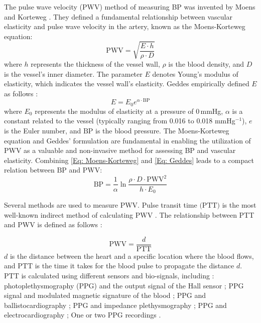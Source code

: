 \documentclass[journal,article,moreauthors]{Definitions/mdpi}
\begin{document}
The pulse wave velocity (PWV) method of measuring BP was invented by Moens and Korteweg \citep{Cole2007-rx}. They defined a fundamental relationship between vascular elasticity and pulse wave velocity in the artery, known as the Moens-Korteweg equation\citep{geddes2013handbook,peter2014review}:
\begin{equation}\label{Eq: Moens-Korteweg}
\text{PWV} = \sqrt{\frac{E\cdot h}{\rho\cdot D}}
\end{equation}
where $h$ represents the thickness of the vessel wall, $\rho$ is the blood density, and $D$ is the vessel's inner diameter. The parameter $E$ denotes Young's modulus of elasticity, which indicates the vessel wall's elasticity. Geddes empirically defined $E$ as follows \citep{peter2014review}:
\begin{equation}\label{Eq: Geddes}
E = E_{0}e^{\alpha \cdot \text{BP}}
\end{equation}
where $E_{0}$ represents the modulus of elasticity at a pressure of 0\,mmHg, $\alpha$ is a constant related to the vessel (typically ranging from 0.016 to 0.018 mmHg$^{-1}$), $e$ is the Euler number, and $\text{BP}$ is the blood pressure. The Moens-Korteweg equation and Geddes' formulation are fundamental in enabling the utilization of PWV as a valuable and non-invasive method for assessing BP and vascular elasticity. Combining \eqref{Eq: Moens-Korteweg} and \eqref{Eq: Geddes} leads to a compact relation between $\text{BP}$ and $\text{PWV}$:
\begin{equation}\label{Eq: M-K3}
\text{BP}= \frac{1}{\alpha}\ln\frac{\rho \cdot D \cdot \text{PWV}^2}{h\cdot E_{0}}
\end{equation}

Several methods are used to measure PWV. Pulse transit time $\text{(PTT)}$ is the most well-known indirect method of calculating PWV \citep{mukkamala2015toward}. The relationship between PTT and PWV is defined as follows \citep{peter2014review}:

\begin{equation}\label{Eq: PPTandPWV}
\text{PWV}=\displaystyle\frac{d}{\text{PTT}}
\end{equation}
$d$ is the distance between the heart and a specific location where the blood flows, and $\text{PTT}$ is the time it takes for the blood pulse to propagate the distance $d$. $\text{PTT}$ is calculated using different sensors and bio-signals, including \citep{Mukkamala2018-fi}: photoplethysmography (PPG) and the output signal of the Hall sensor \citep{Nam2013-ez}; PPG signal and modulated magnetic signature of the blood \citep{zhang2016mechanism}; PPG and ballistocardiography \citep{chen2013noninvasive}; PPG and impedance plethysmography \citep{liu2017cuffless}; PPG and electrocardiography \citep{chen2019non}; One or two PPG recordings \citep{mousavi2019blood}.
\end{document}
